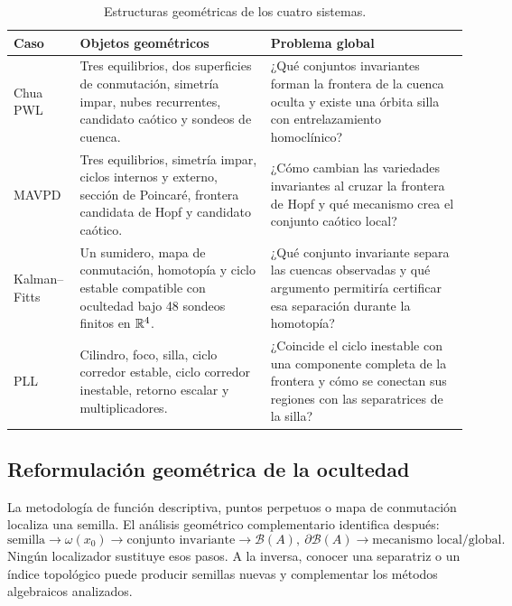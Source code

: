 \begin{table}[H]
\centering
\caption{Estructuras geométricas de los cuatro sistemas.}
\label{geo:tab:four-cases-map}
\small
\begin{tabularx}{\textwidth}{@{}L{0.16\textwidth}Y Y@{}}
\toprule
Caso & Objetos geométricos & Problema global \\
\midrule
Chua PWL & Tres equilibrios, dos superficies de conmutación, simetría impar,
nubes recurrentes, candidato caótico y sondeos de cuenca. & ¿Qué conjuntos
invariantes forman la frontera de la cuenca oculta y existe una órbita silla
con entrelazamiento homoclínico? \\
MAVPD & Tres equilibrios, simetría impar, ciclos internos y externo, sección de
Poincaré, frontera candidata de Hopf y candidato caótico. & ¿Cómo cambian las
variedades invariantes al cruzar la frontera de Hopf y qué mecanismo crea el
conjunto caótico local? \\
Kalman--Fitts & Un sumidero, mapa de conmutación, homotopía y ciclo estable
compatible con ocultedad bajo 48 sondeos finitos en \(\mathbb{R}^4\). & ¿Qué conjunto
invariante separa las cuencas observadas y qué argumento permitiría certificar
esa separación durante la homotopía? \\
PLL & Cilindro, foco, silla, ciclo corredor estable, ciclo corredor inestable,
retorno escalar y multiplicadores. & ¿Coincide el ciclo inestable con una
componente completa de la frontera y cómo se conectan sus regiones con las
separatrices de la silla? \\
\bottomrule
\end{tabularx}
\end{table}

\subsection{Reformulación geométrica de la ocultedad}

La metodología de función descriptiva, puntos perpetuos o mapa de conmutación
localiza una semilla. El análisis geométrico complementario identifica después:
\begin{equation}
 \text{semilla}
 \longrightarrow
 \omega(x_0)
 \longrightarrow
 \text{conjunto invariante}
 \longrightarrow
 \mathcal B(A),\ \partial\mathcal B(A)
 \longrightarrow
 \text{mecanismo local/global}.
 \label{geo:eq:geometry-workflow}
\end{equation}
Ningún localizador sustituye esos pasos. A la inversa, conocer una separatriz
o un índice topológico puede producir semillas nuevas y complementar los
métodos algebraicos analizados.

